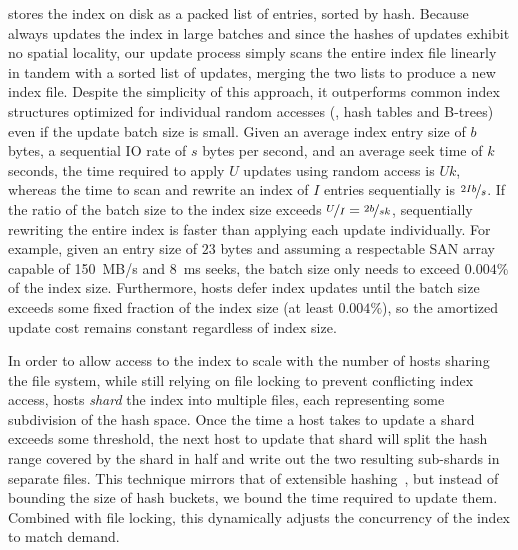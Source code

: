 \DeDe stores the index on disk as a packed list of entries,
sorted by hash.  Because \DeDe always updates the index in large
batches and since the hashes of updates exhibit no spatial
locality, our update process simply scans the entire index file
linearly in tandem with a sorted list of updates, merging the two lists
to produce a new index file.  Despite the simplicity of this
approach, it outperforms common index structures optimized for
individual random accesses (\eg, hash tables and B-trees) even if the
update batch size is small.  Given an average index
entry size of $b$ bytes, a sequential IO rate of $s$ bytes per second,
and an average seek time of $k$ seconds, the time required to apply
$U$ updates using random access is $Uk$, whereas the time to
scan and rewrite
an index of $I$ entries sequentially is $\nicefrac{2Ib}{s}$.  If the
ratio of the batch size to the index size exceeds
$\nicefrac{U}{I} = \nicefrac{2b}{sk}$, sequentially rewriting the
entire index is faster than applying each update individually.
For example, given an entry size of $23$
bytes and assuming a respectable SAN array capable of 150~MB/s and
8~ms seeks, the batch size only needs to exceed $0.004\%$ of the index
size.  Furthermore, hosts defer index updates until the batch size
exceeds some fixed fraction of the index size (at least $0.004\%$), so
the amortized update cost remains
constant regardless of index size.






In order to allow access to the index to scale with the number of
hosts sharing the file system, while still relying on file locking to
prevent conflicting index access, hosts {\it shard} the index into multiple
files, each representing some subdivision of the hash space.  Once the
time a host takes to update a shard exceeds some threshold, the next
host to update that shard will split the hash range covered by the
shard in
half and write out the two resulting sub-shards in separate files.  This
technique mirrors that of extensible
hashing~\cite{fagin79extendiblehashing}, but instead of bounding the
size of hash buckets, we bound the time required to update them.
Combined with file locking, this dynamically adjusts the concurrency
of the index to match demand.

